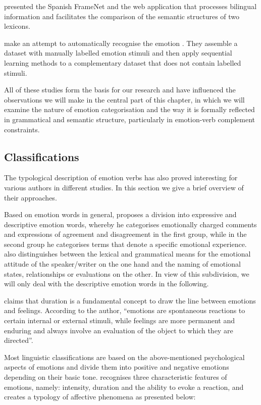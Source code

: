 \documentclass[output=paper,colorlinks,citecolor=brown]{langscibook}
\begin{document}
\citet{subirats2004spanish} presented the Spanish FrameNet and the web application that processes bilingual information and facilitates the comparison of the semantic structures of two lexicons.

\citet{ghazi2015detecting} make an attempt to automatically recognise the emotion . They assemble a dataset with manually labelled emotion stimuli and then apply sequential learning methods to a complementary dataset that does not contain labelled stimuli.

All of these studies form the basis for our research and have influenced the observations we will make in the central part of this chapter, in which we will examine the nature of emotion categorisation and the way it is formally reflected in grammatical and semantic structure, particularly in emotion-verb complement constraints.

\subsection{Classifications}

The typological description of emotion verbs has also proved interesting for various authors in different studies. In this section we give a brief overview of their approaches.
  
Based on emotion words in general, \citet{kovecses2003metaphor} proposes a division into expressive and descriptive emotion words, whereby he categorises emotionally charged comments and expressions of agreement and disagreement in the first group, while in the second group he categorises terms that denote a specific emotional experience. \citet [115]{tisheva2021наблюдения} also distinguishes between the lexical and grammatical means for the emotional attitude of the speaker/writer on the one hand and the naming of emotional states, relationships or evaluations on the other. In view of this subdivision, we will only deal with the descriptive emotion words in the following.

\citet[115]{tisheva2021наблюдения} claims that duration is a fundamental concept to draw the line between emotions and feelings. According to the author, ``emotions are spontaneous reactions to certain internal or external stimuli, while feelings are more permanent and enduring and always involve an evaluation of the object to which they are directed''.

Most linguistic classifications are based on the above-mentioned psychological aspects of emotions and divide them into positive and negative emotions depending on their basic tone. \citet{scherer2005emotions} recognises three characteristic features of emotions, namely: intensity, duration and the ability to evoke a reaction, and creates a typology of affective phenomena as presented below:
 
\end{document}
